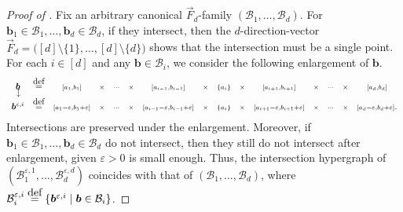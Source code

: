 \documentclass[10pt,a4paper]{amsart}
\newcommand*{\cB}{\mathcal{B}}
\newcommand*{\eqdef}{\stackrel{\mbox{\normalfont\tiny def}}{=}} %
\newcommand*{\vF}{\vec{F}}
\newcommand*{\veps}{\varepsilon}                                %
\begin{document}
\begin{proof}[Proof of ]
    Fix an arbitrary canonical $\vF_d$-family $(\cB_1, \dots, \cB_d)$. For $\bm{b}_1 \in \cB_1, \dots, \bm{b}_d \in \cB_d$, if they intersect, then the $d$-direction-vector $\vF_d = \bigl( [d] \setminus \{1\}, \dots, [d] \setminus \{d\} \bigr)$ shows that the intersection must be a single point. For each $i \in [d]$ and any $\bm{b} \in \cB_i$, we consider the following enlargement of $\bm{b}$.
    \[
    \begin{array}{ccccccccccccccc}
        \bm{b} &\eqdef &{\scriptstyle [a_1, b_1]} &{\scriptstyle \times} &{\scriptstyle \cdots} &{\scriptstyle \times} &{\scriptstyle [a_{i-1}, b_{i-1}]} &{\scriptstyle \times} &{\scriptstyle \{a_i\}} &{\scriptstyle \times} &{\scriptstyle [a_{i+1}, b_{i+1}]} &{\scriptstyle \times} &{\scriptstyle \cdots} &{\scriptstyle \times} &{\scriptstyle [a_d, b_d]} \\[-1.25em]
        \rotatebox{-90}{$\mapsto$} & & & & & & & & & & & & & & \\[0.5em]
        \bm{b}^{\veps, i} &\eqdef &{\scriptstyle [a_1-\veps, b_1+\veps]} &{\scriptstyle \times} &{\scriptstyle \cdots} &{\scriptstyle \times} &{\scriptstyle [a_{i-1}-\veps, b_{i-1}+\veps]} &{\scriptstyle \times} &{\scriptstyle \{a_i\}} &{\scriptstyle \times} &{\scriptstyle [a_{i+1}-\veps, b_{i+1}+\veps]} &{\scriptstyle \times} &{\scriptstyle \cdots} &{\scriptstyle \times} &{\scriptstyle [a_d-\veps, b_d+\veps]}. 
    \end{array}
    \]
    Intersections are preserved under the enlargement. Moreover, if $\bm{b}_1 \in \cB_1, \dots, \bm{b}_d \in \cB_d$ do not intersect, then they still do not intersect after enlargement, given $\veps > 0$ is small enough. Thus, the intersection hypergraph of $(\cB_1^{\veps, 1}, \dots, \cB_d^{\veps, d})$ coincides with that of $(\cB_1, \dots, \cB_d)$, where $\cB_i^{\veps, i} \eqdef \{\bm{b}^{\veps, i} \mid \bm{b} \in \cB_i\}$. 


\end{proof}
\end{document}
